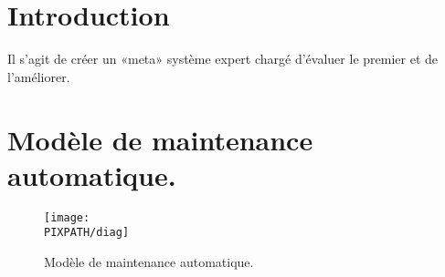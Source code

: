 \section*{Introduction}
Il s'agit de créer un «meta» système expert chargé
d'évaluer le premier et de l'améliorer.


\section{Modèle de maintenance automatique.}
\begin{figure}[!h]
\begin{center}
        \texttt{[image: \\PIXPATH/diag]}
        \caption{Modèle de maintenance automatique.}
\end{center}
\end{figure}
